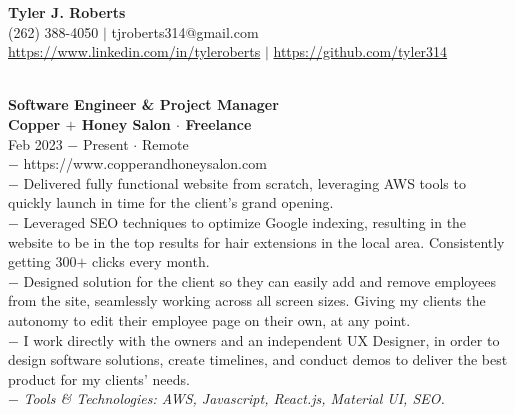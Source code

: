 \documentclass{resume}
\begin{document}
\begin{center}
{\LARGE \bf Tyler J. Roberts} \\[1mm]
\footnotesize
(262) 388-4050 $|$
tjroberts314@gmail.com \\[1mm]
\href{https://www.linkedin.com/in/tyleroberts}{https://www.linkedin.com/in/tyleroberts} $|$
\href{https://github.com/tyler314}{https://github.com/tyler314}
\end{center}
\begin{flushleft}

\\[2mm]

\normalsize{\bf Software Engineer \& Project Manager}\\
\footnotesize{\bf Copper $+$ Honey Salon $\cdot$ Freelance}\\
\footnotesize{Feb 2023 $-$ Present $\cdot$ Remote}\\[1mm]
{\scriptsize
	$-$ https://www.copperandhoneysalon.com\\
	$-$ Delivered fully functional website from scratch, leveraging AWS tools to quickly launch in time for the client's grand opening.\\
	$-$ Leveraged SEO techniques to optimize Google indexing, resulting in the website to be in the top results for hair extensions in the local area. Consistently getting 300$+$ clicks every month.\\
	$-$ Designed solution for the client so they can easily add and remove employees from the site, seamlessly working across all screen sizes. Giving my clients the autonomy to edit their employee page on their own, at any point.\\
	$-$ I work directly with the owners and an independent UX Designer, in order to design software solutions, create timelines, and conduct demos to deliver the best product for my clients' needs.\\
	$-$ \textit{Tools \& Technologies: AWS, Javascript, React.js, Material UI, SEO.}
}\\[3mm]


\end{flushleft}
\end{document}
